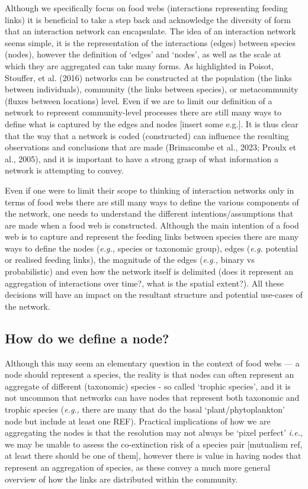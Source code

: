 \documentclass[
]{article}
\begin{document}
Although we specifically focus on food webs (interactions representing
feeding links) it is beneficial to take a step back and acknowledge the
diversity of form that an interaction network can encapsulate. The idea
of an interaction network seems simple, it is the representation of the
interactions (edges) between species (nodes), however the definition of
`edges' and `nodes', as well as the scale at which they are aggregated
can take many forms. As highlighted in Poisot, Stouffer, et al. (2016)
networks can be constructed at the population (the links between
individuals), community (the links between species), or metacommunity
(fluxes between locations) level. Even if we are to limit our definition
of a network to represent community-level processes there are still many
ways to define what is captured by the edges and nodes {[}insert some
e.g.{]}. It is thus clear that the way that a network is coded
(constructed) can influence the resulting observations and conclusions
that are made (Brimacombe et al., 2023; Proulx et al., 2005), and it is
important to have a strong grasp of what information a network is
attempting to convey.

Even if one were to limit their scope to thinking of interaction
networks only in terms of food webs there are still many ways to define
the various components of the network, one needs to understand the
different intentions/assumptions that are made when a food web is
constructed. Although the main intention of a food web is to capture and
represent the feeding links between species there are many ways to
define the nodes (\emph{e.g.,} species or taxonomic group), edges
(\emph{e.g.} potential or realised feeding links), the magnitude of the
edges (\emph{e.g.,} binary vs probabilistic) and even how the network
itself is delimited (does it represent an aggregation of interactions
over time?, what is the spatial extent?). All these decisions will have
an impact on the resultant structure and potential use-cases of the
network.

\subsection{How do we define a node?}\label{how-do-we-define-a-node}

Although this may seem an elementary question in the context of food
webs --- a node should represent a species, the reality is that nodes
can often represent an aggregate of different (taxonomic) species - so
called `trophic species', and it is not uncommon that networks can have
nodes that represent both taxonomic and trophic species (\emph{e.g.,}
there are many that do the basal `plant/phytoplankton' node but include
at least one REF). Practical implications of how we are aggregating the
nodes is that the resolution may not always be `pixel perfect'
\emph{i.e.,} we may be unable to assess the co-extinction risk of a
species pair {[}mutualism ref, at least there should be one of them{]},
however there is value in having nodes that represent an aggregation of
species, as these convey a much more general overview of how the links
are distributed within the community.
\end{document}
